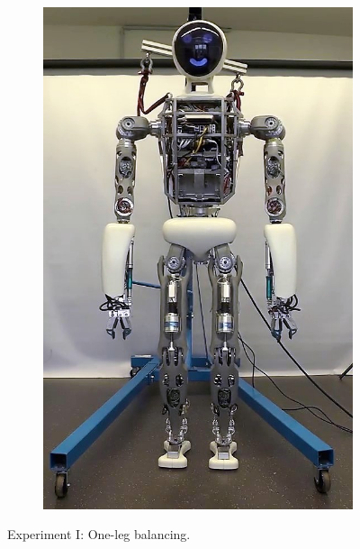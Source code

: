 \begin{figure}[h!]
\begin{subfigure}{.2\textwidth}
	\includegraphics[width=.95\linewidth]{experiments/balancing/snaps/5}
	\end{subfigure}%
\caption{Experiment I: One-leg balancing.}
\label{exp:balancingSnaps}
\end{figure} 

